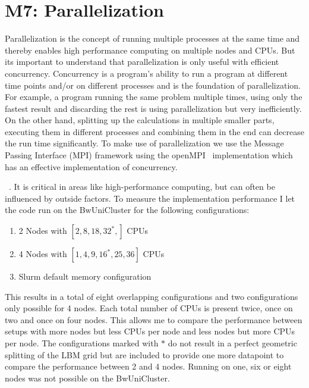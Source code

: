 \section{M7: Parallelization}
Parallelization is the concept of running multiple processes at the same time and thereby enables high performance computing on multiple nodes and CPUs. 
But its important to understand that parallelization is only useful with efficient concurrency. 
Concurrency is a program's ability to run a program at different time points and/or on different processes and is the foundation of parallelization.
For example, a program running the same problem multiple times, using only the fastest result and discarding the rest is using parallelization but very inefficiently.
On the other hand, splitting up the calculations in multiple smaller parts, executing them in different processes and combining them in the end can decrease the run time significantly.
To make use of parallelization we use the Message Passing Interface (MPI) framework using the openMPI~\cite{gabriel04:_open_mpi} implementation which has an effective implementation of concurrency.

~\cite{beyer2019-benchmark}.
It is critical in areas like high-performance computing, but can often be influenced by outside factors.  
To measure the implementation performance I let the code run on the BwUniCluster for the following configurations:
\begin{enumerate}
    \item 2 Nodes with $[2, 8, 18, 32^{*},]$ CPUs
    \item 4 Nodes with $[1, 4, 9, 16^{*}, 25, 36]$ CPUs
    \item Slurm default memory configuration
\end{enumerate}
This results in a total of eight overlapping configurations and two configurations only possible for 4 nodes. Each total number of CPUs is present twice, once on two and once on four nodes. 
This allows me to compare the performance between setups with more nodes but less CPUs per node and less nodes but more CPUs per node.
The configurations marked with $*$ do not result in a perfect geometric splitting of the LBM grid but are included to provide one more datapoint to compare the performance between 2 and 4 nodes.
Running on one, six or eight nodes was not possible on the BwUniCluster.

